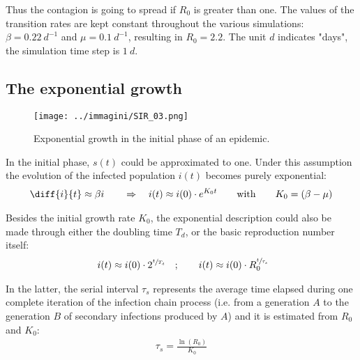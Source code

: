 \documentclass[DIV=12, BCOR=0pt]{scrartcl}  %
\begin{document}
  Thus the contagion is going to spread if $R_{0}$ is greater than one. The values of the transition rates are kept constant throughout the various simulations: $\beta = 0.22 \ d^{-1}$ and $\mu = 0.1 \ d^{-1}$, resulting in $R_{0} = 2.2$. The unit $d$ indicates "days", the simulation time step is $1 \ d$.
  
  
  \subsection{The exponential growth}
  
  \begin{figure}[h!]
  	\centering
  	\texttt{[image: ../immagini/SIR\_03.png]}
  	\caption{Exponential growth in the initial phase of an epidemic. }
  	\label{fig:SIRexp}
  \end{figure}
  
  In the initial phase, $s(t)$ could be approximated to one. %
  Under this assumption the evolution of the infected population $i(t)$ becomes purely exponential:
  \begin{align}
  	\diff{i}{t} \approx  \beta i \qquad \Rightarrow \quad 	i(t) \approx i(0) \cdot e^{K_{0} t} \qquad \mathrm{with} \qquad K_{0} = (\beta - \mu)
  \end{align}
	
	Besides the initial growth rate $K_{0}$, the exponential description could also be made through either the doubling time $T_{d}$, or the basic reproduction number itself:
	\begin{align}
		\ i(t) \approx i(0) \cdot 2^{\sfrac{t}{T_{d}}} \quad ; \qquad i(t) \approx i(0) \cdot R_{0}^{\sfrac{t}{\tau_{s}}}
	\end{align}
	
	In the latter, the serial interval $\tau_{s}$ represents the average time elapsed during one complete iteration of the infection chain process (i.e. from a generation $A$ to the generation $B$ of secondary infections produced by $A$) and it is estimated from $R_{0}$ and $K_{0}$: 
	\begin{align}
		\tau_{s} = \frac{\ln(R_{0})}{K_{0}}
	\end{align}
\end{document}
